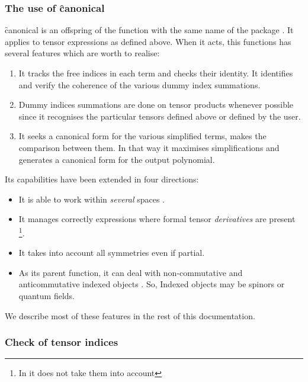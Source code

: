 \subsubsection{The use of \f{canonical}}

\f{canonical}  is an offspring of the function
with the same name of the package .
It applies to tensor expressions as defined above.
When it acts, this functions has several features which are
worth to realise:
\begin{enumerate}
\item It tracks the free indices in each term  and checks their
identity.  It identifies and verify the coherence
of the various dummy index summations.
\item Dummy indices summations are done on tensor products whenever
possible since it recognises the particular tensors
defined above or defined by the user.
\item It seeks a canonical form for the
various simplified terms, makes the comparison between them.
In that way it maximises simplifications and generates a canonical form
for the output polynomial.
\end{enumerate}
Its capabilities  have been extended in four directions:
\begin{itemize}
\item It is able to work within \emph{several} spaces%
.
\item It manages correctly expressions where
formal tensor \emph{derivatives} are present%
\footnote{In  it does not take them into account}.
\item It takes into account all symmetries even if partial.
\item As its parent function, it can deal with non-commutative
and anticommutative indexed objects%
.
So, Indexed objects may be spinors%
 or quantum fields.
\end{itemize}
We describe most of these features in the rest of this
documentation.
\subsubsection{Check of tensor indices}

